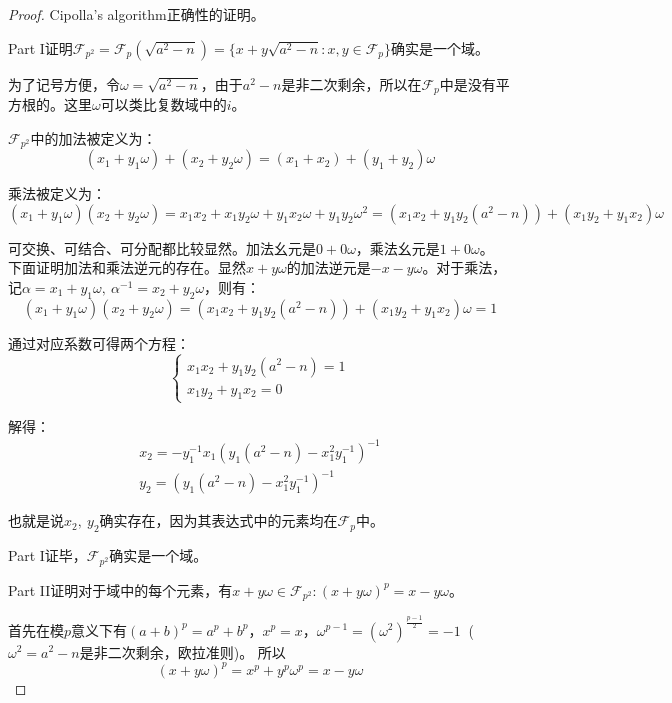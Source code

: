 \vbox{}

\begin{proof}
Cipolla's algorithm正确性的证明。

{\heiti Part I\quad 证明$\mathcal{F}_{p^2}=\mathcal{F}_p(\sqrt{a^2-n})=\{x+y\sqrt{a^2-n}:x,y\in \mathcal{F}_p\}$确实是一个域。}

为了记号方便，令$\omega = \sqrt{a^2-n}$，由于$a^2-n$是非二次剩余，所以在$\mathcal{F}_{p}$中是没有平方根的。这里$\omega$可以类比复数域中的$i$。

$\mathcal{F}_{p^2}$中的加法被定义为：
$$
\left(x_{1}+y_{1} \omega\right)+\left(x_{2}+y_{2} \omega\right)=\left(x_{1}+x_{2}\right)+\left(y_{1}+y_{2}\right) \omega
$$

乘法被定义为：
$$
\left(x_{1}+y_{1} \omega\right)\left(x_{2}+y_{2} \omega\right)=x_{1} x_{2}+x_{1} y_{2} \omega+y_{1} x_{2} \omega+y_{1} y_{2} \omega^{2}=\left(x_{1} x_{2}+y_{1} y_{2}\left(a^{2}-n\right)\right)+\left(x_{1} y_{2}+y_{1} x_{2}\right) \omega
$$

可交换、可结合、可分配都比较显然。加法幺元是$0+0\omega$，乘法幺元是$1+0\omega$。
下面证明加法和乘法逆元的存在。显然$x+y\omega$的加法逆元是$-x-y\omega$。对于乘法，记$\alpha = x_1+y_1\omega,\ \alpha^{-1}=x_{2}+y_{2} \omega$，则有：
$$
\left(x_{1}+y_{1} \omega\right)\left(x_{2}+y_{2} \omega\right)=\left(x_{1} x_{2}+y_{1} y_{2}\left(a^{2}-n\right)\right)+\left(x_{1} y_{2}+y_{1} x_{2}\right) \omega=1
$$

通过对应系数可得两个方程：
$$
\left\{\begin{array}{l}{x_{1} x_{2}+y_{1} y_{2}\left(a^{2}-n\right)=1} \\ {x_{1} y_{2}+y_{1} x_{2}=0}\end{array}\right.
$$

解得：
$$
\begin{array}{l}{x_{2}=-y_{1}^{-1} x_{1}\left(y_{1}\left(a^{2}-n\right)-x_{1}^{2} y_{1}^{-1}\right)^{-1}} \\ {y_{2}=\left(y_{1}\left(a^{2}-n\right)-x_{1}^{2} y_{1}^{-1}\right)^{-1}}\end{array}
$$

也就是说$x_2,\ y_2$确实存在，因为其表达式中的元素均在$\mathcal{F}_{p}$中。

Part I证毕，$\mathcal{F}_{p^2}$确实是一个域。

\vbox{}

{\heiti Part II\quad 证明对于域中的每个元素，有$x+y \omega \in \mathcal{F}_{p^{2}}:(x+y \omega)^{p}=x-y \omega$。}

首先在模$p$意义下有$(a+b)^p = a^p + b^p$，$x^p=x$，$\omega^{p-1}=\left(\omega^{2}\right)^{\frac{p-1}{2}}=-1 \ $ ($\omega^2=a^2-n$是非二次剩余，欧拉准则)。
所以
$$
(x+y \omega)^{p}=x^{p}+y^{p} \omega^{p}=x-y \omega
$$


\end{proof}
